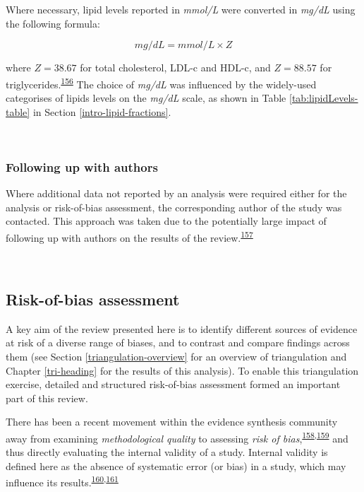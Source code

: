 \documentclass[a4paper, twoside]{templates/ociamthesis}
\begin{document}
Where necessary, lipid levels reported in \emph{mmol/L} were converted in \emph{mg/dL} using the following formula:

\begin{equation} 
  mg/dL = mmol/L \times{} Z
  \label{eq:lipidConversion}
\end{equation}

where \(Z = 38.67\) for total cholesterol, LDL-c and HDL-c, and \(Z = 88.57\) for triglycerides.\textsuperscript{\protect\hyperlink{ref-rugge2011}{156}} The choice of \emph{mg/dL} was influenced by the widely-used categorises of lipids levels on the \emph{mg/dL} scale, as shown in Table \ref{tab:lipidLevels-table} in Section \ref{intro-lipid-fractions}.

~

\hypertarget{contacting-authors}{%
\subsubsection{Following up with authors}\label{contacting-authors}}

Where additional data not reported by an analysis were required either for the analysis or risk-of-bias assessment, the corresponding author of the study was contacted. This approach was taken due to the potentially large impact of following up with authors on the results of the review.\textsuperscript{\protect\hyperlink{ref-reynders2019}{157}}

~

\hypertarget{risk-of-bias}{%
\subsection{Risk-of-bias assessment}\label{risk-of-bias}}

A key aim of the review presented here is to identify different sources of evidence at risk of a diverse range of biases, and to contrast and compare findings across them (see Section \ref{triangulation-overview} for an overview of triangulation and Chapter \ref{tri-heading} for the results of this analysis). To enable this triangulation exercise, detailed and structured risk-of-bias assessment formed an important part of this review.

There has been a recent movement within the evidence synthesis community away from examining \emph{methodological quality} to assessing \emph{risk of bias},\textsuperscript{\protect\hyperlink{ref-mcguinness2018}{158},\protect\hyperlink{ref-sterne2016}{159}} and thus directly evaluating the internal validity of a study. Internal validity is defined here as the absence of systematic error (or bias) in a study, which may influence its results.\textsuperscript{\protect\hyperlink{ref-campbell1957}{160},\protect\hyperlink{ref-juni2001}{161}}
\end{document}
